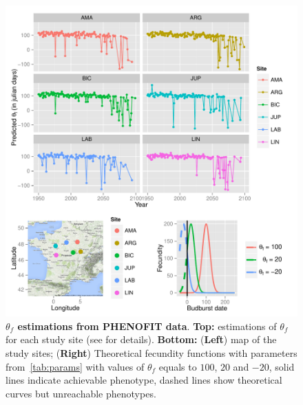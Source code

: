 \documentclass[a4paper, 12pt]{article}
\begin{document}
\begin{figure}[ht!]
	\centering
	\includegraphics[scale=1]{Figures/optsmaps.pdf}
	\caption{\textbf{$\theta_{f}$ estimations from PHENOFIT data}. \textbf{Top:} estimations of $\theta_f$ for each study site (see  for details). \textbf{Bottom:} (\textbf{Left}) map of the study sites; (\textbf{Right}) Theoretical fecundity functions with parameters from~\autoref{tab:params} with values of $\theta_f$ equals to $100$, $20$ and $-20$, solid lines indicate achievable phenotype, dashed lines show theoretical curves but unreachable phenotypes.}
	\label{fig:thetaf}
\end{figure}
\end{document}
